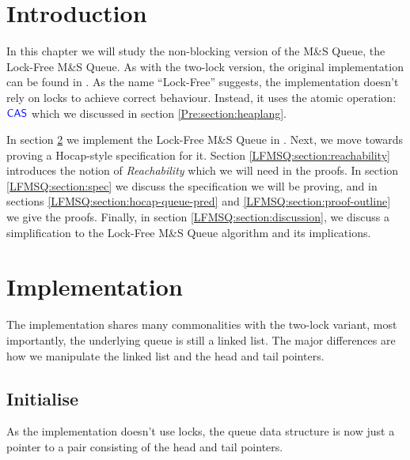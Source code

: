 \documentclass[a4paper, 10pt]{report}
\theoremstyle{definition}
\newcommand{\msq}{M\&S Queue}
\newcommand{\lfmsq}{Lock-Free \msq{}}
\begin{document}
\section{Introduction}
\label{LFMSQ:section:introduction}

In this chapter we will study the non-blocking version of the \msq{}, the \lfmsq{}. As with the two-lock version, the original implementation can be found in \citet{DBLP:conf/podc/MichaelS96}. As the name ``Lock-Free'' suggests, the implementation doesn't rely on locks to achieve correct behaviour. Instead, it uses the atomic operation: $\textsf{\color{blue} CAS}$ which we discussed in section \ref{Pre:section:heaplang}.

In section \ref{LFMSQ:section:implementation} we implement the \lfmsq{} in \heaplang. Next, we move towards proving a Hocap-style specification for it. Section \ref{LFMSQ:section:reachability} introduces the notion of \textit{Reachability} which we will need in the proofs. In section \ref{LFMSQ:section:spec} we discuss the specification we will be proving, and in sections \ref{LFMSQ:section:hocap-queue-pred} and \ref{LFMSQ:section:proof-outline} we give the proofs. Finally, in section \ref{LFMSQ:section:discussion}, we discuss a simplification to the \lfmsq{} algorithm and its implications.

\section{Implementation}
\label{LFMSQ:section:implementation}

The implementation shares many commonalities with the two-lock variant, most importantly, the underlying queue is still a linked list. The major differences are how we manipulate the linked list and the head and tail pointers.

\subsection{Initialise}
As the implementation doesn't use locks, the queue data structure is now just a pointer to a pair consisting of the head and tail pointers.
\end{document}
